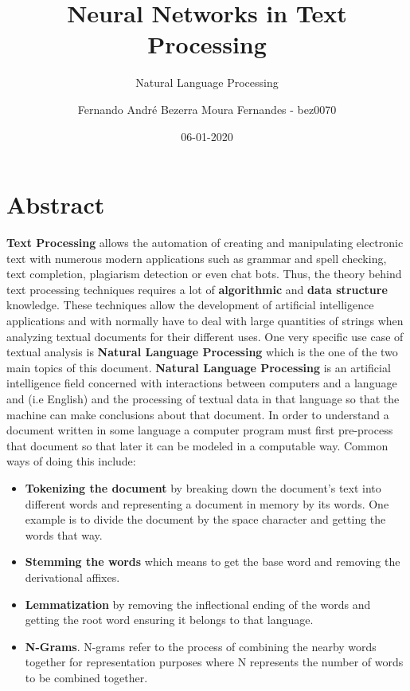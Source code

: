 \documentclass{scrartcl}
\title{Neural Networks in Text Processing}
\subtitle{ Natural Language Processing }
\date{06-01-2020}
\author{Fernando André Bezerra Moura Fernandes - bez0070}
\begin{document}
    \maketitle
    \newpage
    \tableofcontents
    \newpage
    \section{ Abstract }
    \textbf{Text Processing} allows the automation of creating and manipulating electronic text 
    with numerous modern applications such as grammar and spell checking, text completion,
    plagiarism detection or even chat bots. Thus, the theory behind text processing techniques
    requires a lot of \textbf{algorithmic} and \textbf{data structure} knowledge. \newline
    These techniques allow the development of artificial intelligence applications and with
    normally have to deal with large quantities of strings when analyzing textual documents
    for their different uses. \newline
    One very specific use case of textual analysis is \textbf{Natural Language Processing} 
    which is the one of the two main topics of this document. \newline
    \textbf{Natural Language Processing} is an artificial intelligence field concerned with 
    interactions between computers and a language and (i.e English) and the
    processing of textual data in that language so that the machine can make
    conclusions about that document. \newline
    In order to understand a document written in some language a computer program must first
    pre-process that document so that later it can be modeled in a computable way. 
    Common ways of doing this include:
    \begin{itemize}
        \item \textbf{Tokenizing the document} by breaking down the document's text into 
        different words and representing a document in memory by its words. One example is to
        divide the document by the space character and getting the words that way.
        \item \textbf{Stemming the words} which means to get the base word and removing the 
        derivational affixes.  
        \item \textbf{Lemmatization} by removing the inflectional ending of the words and getting
        the root word ensuring it belongs to that language.
        \item \textbf{N-Grams}. N-grams refer to the process of combining the nearby words 
        together for representation purposes where N represents the number of words to be 
        combined together.
    \end{itemize}
\end{document}
